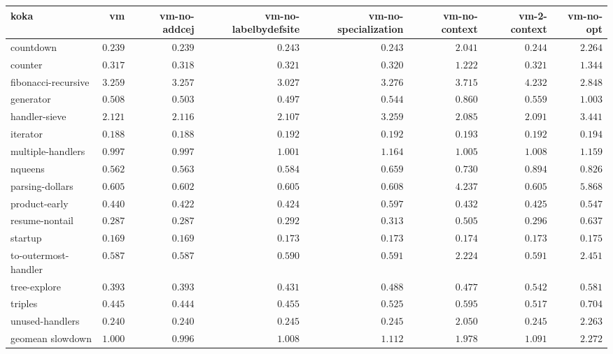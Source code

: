 \begin{tabular}{l r r r r r r r}
\toprule koka & vm & vm-no-addcej & vm-no-labelbydefsite & vm-no-specialization & vm-no-context & vm-2-context & vm-no-opt \\
\midrule
countdown & $0.239$ & $\mathbf{0.239}$ & $0.243$ & $0.243$ & $2.041$ & $0.244$ & $2.264$ \\
counter & $\mathbf{0.317}$ & $0.318$ & $0.321$ & $0.320$ & $1.222$ & $0.321$ & $1.344$ \\
fibonacci-recursive & $3.259$ & $3.257$ & $3.027$ & $3.276$ & $3.715$ & $4.232$ & $\mathbf{2.848}$ \\
generator & $0.508$ & $0.503$ & $\mathbf{0.497}$ & $0.544$ & $0.860$ & $0.559$ & $1.003$ \\
handler-sieve & $2.121$ & $2.116$ & $2.107$ & $3.259$ & $\mathbf{2.085}$ & $2.091$ & $3.441$ \\
iterator & $0.188$ & $\mathbf{0.188}$ & $0.192$ & $0.192$ & $0.193$ & $0.192$ & $0.194$ \\
multiple-handlers & $\mathbf{0.997}$ & $0.997$ & $1.001$ & $1.164$ & $1.005$ & $1.008$ & $1.159$ \\
nqueens & $\mathbf{0.562}$ & $0.563$ & $0.584$ & $0.659$ & $0.730$ & $0.894$ & $0.826$ \\
parsing-dollars & $0.605$ & $\mathbf{0.602}$ & $0.605$ & $0.608$ & $4.237$ & $0.605$ & $5.868$ \\
product-early & $0.440$ & $\mathbf{0.422}$ & $0.424$ & $0.597$ & $0.432$ & $0.425$ & $0.547$ \\
resume-nontail & $\mathbf{0.287}$ & $0.287$ & $0.292$ & $0.313$ & $0.505$ & $0.296$ & $0.637$ \\
startup & $\mathbf{0.169}$ & $0.169$ & $0.173$ & $0.173$ & $0.174$ & $0.173$ & $0.175$ \\
to-outermost-handler & $0.587$ & $\mathbf{0.587}$ & $0.590$ & $0.591$ & $2.224$ & $0.591$ & $2.451$ \\
tree-explore & $\mathbf{0.393}$ & $0.393$ & $0.431$ & $0.488$ & $0.477$ & $0.542$ & $0.581$ \\
triples & $0.445$ & $\mathbf{0.444}$ & $0.455$ & $0.525$ & $0.595$ & $0.517$ & $0.704$ \\
unused-handlers & $0.240$ & $\mathbf{0.240}$ & $0.245$ & $0.245$ & $2.050$ & $0.245$ & $2.263$ \\
\midrule
 geomean slowdown & $1.000$ & $0.996$ & $1.008$ & $1.112$ & $1.978$ & $1.091$ & $2.272$ \\
\bottomrule
\end{tabular}